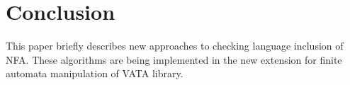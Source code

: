 \documentclass{eeict}
\begin{document}
\section{Conclusion}
This paper briefly describes new approaches to checking language inclusion of NFA. These algorithms are being implemented in the new extension for
finite automata manipulation of VATA library.

\begin{comment}
\subsection{Obrázek}

\begin{figure}[bht]
\begin{center}
  \texttt{[image: bozka\_ss]}
  \caption{
      \rm{
      \hspace{0.1cm} Obrázek Božetěchovy.}}
  \label{bozka_ss.jpg}
\end{center}
\end{figure}
\end{comment}
\end{document}
